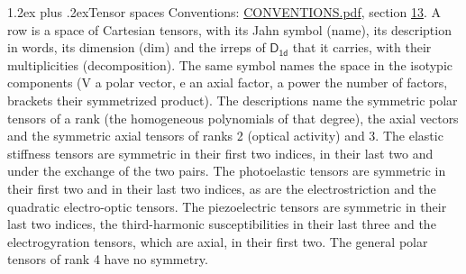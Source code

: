 \documentclass[10pt,a4paper]{article}
\makeatletter
\renewcommand\section{\@startsection{section}{1}{\z@}{-3ex plus -1ex minus -.2ex}%
  {1.2ex plus .2ex}{\normalfont\large\sffamily\bfseries\color{parttitle}}}
\numberwithin{equation}{section}
\newcommand{\grp}[1]{\mathsf{#1}}
\makeatother
\begin{document}
\section{Tensor spaces}\label{s:tensor_spaces}
Conventions: \href{../../CONVENTIONS.pdf}{CONVENTIONS.pdf}, section \href{../../CONVENTIONS.pdf\#conv.13}{13}.
\leavevmode\label{n:head.name}\label{n:head.description}\label{n:head.dim}\label{n:head.decomposition}A row is a space of Cartesian tensors, with its Jahn symbol (name), its description in words, its dimension (dim) and the irreps of $\grp{D_{1d}}$ that it carries, with their multiplicities (decomposition). \label{n:label.jahn}The same symbol names the space in the isotypic components (V a polar vector, e an axial factor, a power the number of factors, brackets their symmetrized product). The descriptions name the symmetric polar tensors of a rank (the homogeneous polynomials of that degree), the axial vectors and the symmetric axial tensors of ranks 2 (optical activity) and 3. The elastic stiffness tensors are symmetric in their first two indices, in their last two and under the exchange of the two pairs. The photoelastic tensors are symmetric in their first two and in their last two indices, as are the electrostriction and the quadratic electro-optic tensors. The piezoelectric tensors are symmetric in their last two indices, the third-harmonic susceptibilities in their last three and the electrogyration tensors, which are axial, in their first two. The general polar tensors of rank 4 have no symmetry.
\end{document}
